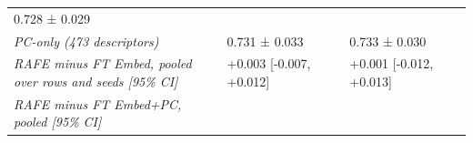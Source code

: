 \documentclass[
  10pt,
]{article}
\begin{document}
\begin{longtable}[]{@{}lllllll@{}}
\begin{minipage}[t]{0.12\columnwidth}
0.728 ± 0.029\strut
\end{minipage}\tabularnewline
\begin{minipage}[t]{0.12\columnwidth}\raggedright
\emph{PC-only (473 descriptors)}\strut
\end{minipage} & \begin{minipage}[t]{0.12\columnwidth}\raggedright
0.731 ± 0.033\strut
\end{minipage} & \begin{minipage}[t]{0.12\columnwidth}\raggedright
\strut
\end{minipage} & \begin{minipage}[t]{0.12\columnwidth}\raggedright
\strut
\end{minipage} & \begin{minipage}[t]{0.12\columnwidth}\raggedright
0.733 ± 0.030\strut
\end{minipage} & \begin{minipage}[t]{0.12\columnwidth}\raggedright
\strut
\end{minipage} & \begin{minipage}[t]{0.12\columnwidth}\raggedright
\strut
\end{minipage}\tabularnewline
\begin{minipage}[t]{0.12\columnwidth}\raggedright
\emph{RAFE minus FT Embed, pooled over rows and seeds {[}95\%
CI{]}}\strut
\end{minipage} & \begin{minipage}[t]{0.12\columnwidth}\raggedright
+0.003 {[}-0.007, +0.012{]}\strut
\end{minipage} & \begin{minipage}[t]{0.12\columnwidth}\raggedright
\strut
\end{minipage} & \begin{minipage}[t]{0.12\columnwidth}\raggedright
\strut
\end{minipage} & \begin{minipage}[t]{0.12\columnwidth}\raggedright
+0.001 {[}-0.012, +0.013{]}\strut
\end{minipage} & \begin{minipage}[t]{0.12\columnwidth}\raggedright
\strut
\end{minipage} & \begin{minipage}[t]{0.12\columnwidth}\raggedright
\strut
\end{minipage}\tabularnewline
\begin{minipage}[t]{0.12\columnwidth}\raggedright
\emph{RAFE minus FT Embed+PC, pooled {[}95\% CI{]}}\strut

\end{minipage}
\end{longtable}
\end{document}
